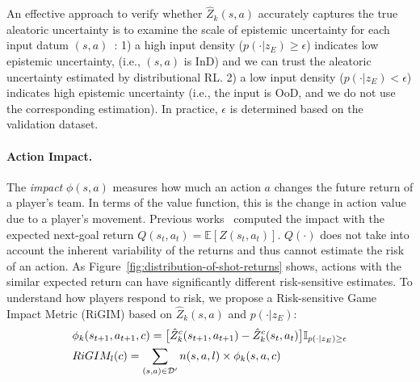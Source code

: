 \documentclass{article}
\newcommand{\condition}{z_{E}}
\newcommand{\state}{s}
\newcommand{\action}{a}
\newcommand{\agentIndex}{k}
\newcommand{\dataset}{\mathcal{D}}
\newcommand{\expect}{\mathbb{E}}
\newcommand{\confidence}{c}
\newcommand{\impact}{\phi}
\newcommand{\playerId}{l}
\newcommand{\sys}{RiGIM}
\newcommand{\system}{\sys\;}
\begin{document}
An effective approach to verify whether $\hat{Z}_{\agentIndex}(\state,\action)$ accurately captures the true aleatoric uncertainty is to examine the scale of epistemic uncertainty for each input datum $(\state,\action)$~\cite{Mukhoti2021Uncertainty}: 1) a high input density ($p(\cdot|\condition)\geq\epsilon$) indicates low epistemic uncertainty,
(i.e., $(\state,\action)$ is InD)
and we can trust the aleatoric uncertainty estimated by distributional RL. 2) a low input density ($p(\cdot|\condition)<\epsilon$) indicates high epistemic uncertainty (i.e., the input is OoD, and we do not use the corresponding estimation). In practice, $\epsilon$ is determined based on the validation dataset.

\paragraph{Action Impact.}
The {\it impact} $\impact(\state,\action)$ measures how much an action $\action$ changes the future return of a player's team. In terms of the value function, this is the change in action value due to a player’s movement. 
Previous works~\cite{Routley2015Markov,Liu2018DRL,Decroos2019Actions} computed the impact with the expected next-goal return $Q(\state_{t},\action_{t})=\expect[Z(\state_{t},\action_{t})]$. $Q(\cdot)$ does not take into account the inherent variability of the returns and thus cannot estimate the risk of an action. As Figure~\ref{fig:distribution-of-shot-returns} shows, actions with the similar expected return can have significantly different risk-sensitive estimates. To understand how players respond to risk, we propose a Risk-sensitive Game Impact Metric (\system) based on $\hat{Z}_{\agentIndex}(\state,\action)$ and $p(\cdot|\condition)$:
\begin{align}
    &\impact_{\agentIndex}(\state_{t+1},\action_{t+1},\confidence)=\big[\hat{Z}^{\confidence}_{\agentIndex}(\state_{t+1},\action_{t+1})-
    \hat{Z}^{\confidence}_{\agentIndex}(\state_{t},\action_{t})\big]\mathbb{I}_{p(\cdot|\condition)\geq\epsilon}
    \nonumber\\
    &\sys_{\playerId}(\confidence)=\sum_{(\state,\action)\in\dataset^{\prime}}n(\state,\action,\playerId)\times\impact_{\agentIndex}(\state,\action,\confidence)\label{eqn:RIGIM}
    \vspace{-0.1in}
\end{align}
\end{document}

